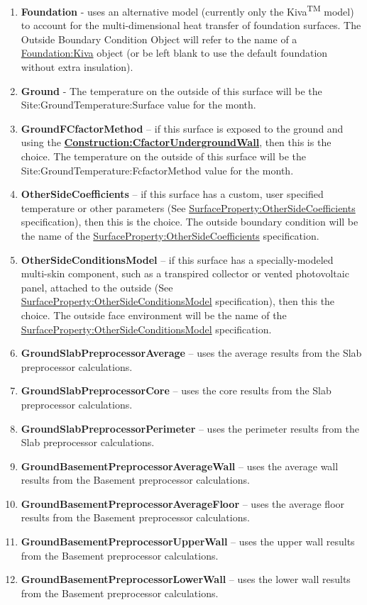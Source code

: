 \begin{enumerate}
  \item
    \textbf{Foundation} - uses an alternative model (currently only the Kiva\textsuperscript{TM} model) to account for the multi-dimensional heat transfer of foundation surfaces. The Outside Boundary Condition Object will refer to the name of a \hyperref[foundationkiva]{Foundation:Kiva} object (or be left blank to use the default foundation without extra insulation).
  \item
    \textbf{Ground} - The temperature on the outside of this surface will be the Site:GroundTemperature:Surface value for the month.
  \item
    \textbf{GroundFCfactorMethod} -- if this surface is exposed to the ground and using the \textbf{\hyperref[constructioncfactorundergroundwall]{Construction:CfactorUndergroundWall}}, then this is the choice. The temperature on the outside of this surface will be the Site:GroundTemperature:FcfactorMethod value for the month.
  \item
    \textbf{OtherSideCoefficients} -- if this surface has a custom, user specified temperature or other parameters (See \hyperref[surfacepropertyothersidecoefficients]{SurfaceProperty:OtherSideCoefficients} specification), then this is the choice. The outside boundary condition will be the name of the \hyperref[surfacepropertyothersidecoefficients]{SurfaceProperty:OtherSideCoefficients} specification.
  \item
    \textbf{OtherSideConditionsModel} -- if this surface has a specially-modeled multi-skin component, such as a transpired collector or vented photovoltaic panel, attached to the outside (See \hyperref[surfacepropertyothersideconditionsmodel]{SurfaceProperty:OtherSideConditionsModel} specification), then this the choice. The outside face environment will be the name of the \hyperref[surfacepropertyothersideconditionsmodel]{SurfaceProperty:OtherSideConditionsModel} specification.
  \item
    \textbf{GroundSlabPreprocessorAverage} -- uses the average results from the Slab preprocessor calculations.
  \item
    \textbf{GroundSlabPreprocessorCore} -- uses the core results from the Slab preprocessor calculations.
  \item
    \textbf{GroundSlabPreprocessorPerimeter} -- uses the perimeter results from the Slab preprocessor calculations.
  \item
    \textbf{GroundBasementPreprocessorAverageWall} -- uses the average wall results from the Basement preprocessor calculations.
  \item
    \textbf{GroundBasementPreprocessorAverageFloor} -- uses the average floor results from the Basement preprocessor calculations.
  \item
    \textbf{GroundBasementPreprocessorUpperWall} -- uses the upper wall results from the Basement preprocessor calculations.
  \item
    \textbf{GroundBasementPreprocessorLowerWall} -- uses the lower wall results from the Basement preprocessor calculations.
\end{enumerate}

